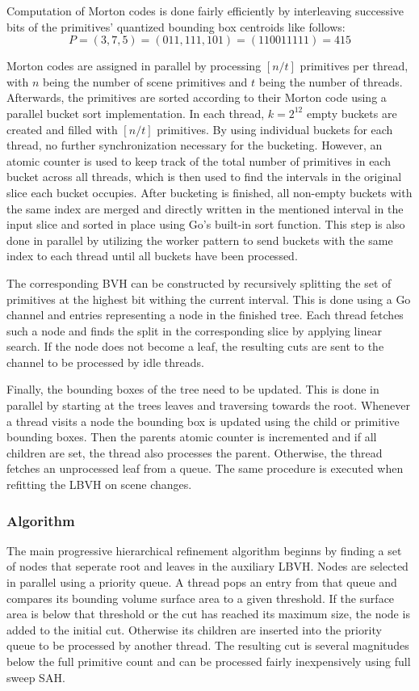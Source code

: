 Computation of Morton codes is done fairly efficiently by interleaving successive bits of the primitives' quantized bounding box 
centroids like follows: 
\[P=(3,7,5)=(011,111,101)=(110011111)=415\] %

Morton codes are assigned in parallel by processing $[n/t]$ primitives per thread, with $n$ being the number of scene primitives and $t$ being the number of threads. Afterwards, the primitives are sorted according to their Morton code using a parallel bucket sort implementation. In each thread, $k=2^{12}$ empty buckets are created and filled with $[n/t]$ primitives. By using individual buckets for each thread, no further synchronization necessary for the bucketing. However, an atomic counter is used to keep track of the total number of primitives in each bucket across all threads, which is then used to find the intervals in the original slice each bucket occupies. After bucketing is finished, all non-empty buckets with the same index are merged and directly written in the mentioned interval in the input slice and sorted in place using Go's built-in sort function. This step is also done in parallel by utilizing the worker pattern to send buckets with the same index to each thread until all buckets have been processed.

The corresponding BVH can be constructed by recursively splitting the set of primitives at the highest bit withing the current interval. This is done using a Go channel and entries representing a node in the finished tree. Each thread fetches such a node and finds the split in the corresponding slice by applying linear search. If the node does not become a leaf, the resulting cuts are sent to the channel to be processed by idle threads.

Finally, the bounding boxes of the tree need to be updated. This is done in parallel by starting at the trees leaves and traversing towards the root. Whenever a thread visits a node the bounding box is updated using the child or primitive bounding boxes. Then the parents atomic counter is incremented and if all children are set, the thread also processes the parent. Otherwise, the thread fetches an unprocessed leaf from a queue. The same procedure is executed when refitting the LBVH on scene changes. 
\subsubsection{Algorithm}
The main progressive hierarchical refinement algorithm beginns by finding a set of nodes that seperate root and leaves in the auxiliary LBVH. Nodes are selected in parallel using a priority queue. A thread pops an entry from that queue and compares its bounding volume surface area to a given threshold. If the surface area is below that threshold or the cut has reached its maximum size, the node is added to the initial cut. Otherwise its children are inserted into the priority queue to be processed by another thread. The resulting cut is several magnitudes below the full primitive count and can be processed fairly inexpensively using full sweep SAH.

